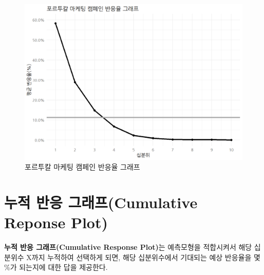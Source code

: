\documentclass[
  letterpaper,
  chapter,a4paper,showtrims,openright,hidelinks]{oblivoir}
\begin{document}
\begin{figure}

{\centering \includegraphics{images/model_value_response.png}

}

\caption{포르투칼 마케팅 캠페인 반응율 그래프}

\end{figure}

\hypertarget{predictive-model-caret-business-cumulative-response-plot}{%
\section{누적 반응 그래프(Cumulative Reponse
Plot)}\label{predictive-model-caret-business-cumulative-response-plot}}

\textbf{누적 반응 그래프(Cumulative Response Plot)}는 예측모형을
적합시켜서 해당 십분위수 X까지 누적하여 선택하게 되면, 해당 십분위수에서
기대되는 예상 반응율을 몇 \%가 되는지에 대한 답을 제공한다.
\end{document}
